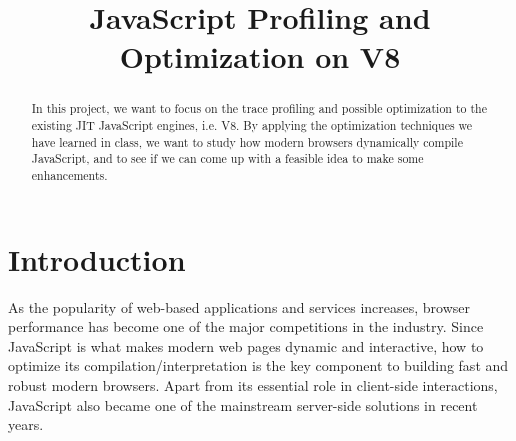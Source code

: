 \documentclass[conference]{IEEEtran}
\begin{document}
\title{JavaScript Profiling and Optimization on V8}

\author{
\and
{}
}

\maketitle

\begin{abstract}
In this project, we want to focus on the trace profiling and possible optimization to the existing JIT JavaScript engines, i.e. V8. By applying the optimization techniques we have learned in class, we want to study how modern browsers dynamically compile JavaScript, and to see if we can come up with a feasible idea to make some enhancements.

\end{abstract}

\section{Introduction}
As the popularity of web-based applications and services increases, browser performance has become one of the major competitions in the industry. Since JavaScript is what makes modern web pages dynamic and interactive, how to optimize its compilation/interpretation is the key component to building fast and robust modern browsers. Apart from its essential role in client-side interactions, JavaScript also became one of the mainstream server-side solutions in recent years\cite{node}. 
\end{document}
